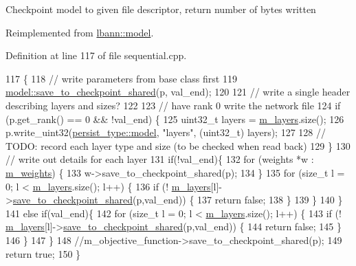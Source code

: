 Checkpoint model to given file descriptor, return number of bytes written 

Reimplemented from \hyperlink{classlbann_1_1model_a3d589d2e46ad35d0a1221e25bef70fa4}{lbann\+::model}.



Definition at line 117 of file sequential.\+cpp.


\begin{DoxyCode}
117                                                                          \{
118   \textcolor{comment}{// write parameters from base class first}
119   \hyperlink{classlbann_1_1model_a3d589d2e46ad35d0a1221e25bef70fa4}{model::save\_to\_checkpoint\_shared}(p, val\_end);
120 
121   \textcolor{comment}{// write a single header describing layers and sizes?}
122 
123   \textcolor{comment}{// have rank 0 write the network file}
124   \textcolor{keywordflow}{if} (p.get\_rank() == 0 && !val\_end) \{
125     uint32\_t layers = \hyperlink{classlbann_1_1model_a0229fc226ec163d1411548446104569d}{m\_layers}.size();
126     p.write\_uint32(\hyperlink{namespacelbann_adee41f31f15f3906cbdcce4a1417eb56a20f35e630daf44dbfa4c3f68f5399d8c}{persist\_type::model}, \textcolor{stringliteral}{"layers"}, (uint32\_t) layers);
127 
128     \textcolor{comment}{// TODO: record each layer type and size (to be checked when read back)}
129   \}
130   \textcolor{comment}{// write out details for each layer}
131   \textcolor{keywordflow}{if}(!val\_end)\{
132     \textcolor{keywordflow}{for} (weights *w : \hyperlink{classlbann_1_1model_aaf9adefe4497d90bf5bc2567e71bfb00}{m\_weights}) \{
133       w->save\_to\_checkpoint\_shared(p);
134     \}
135       \textcolor{keywordflow}{for} (\textcolor{keywordtype}{size\_t} l = 0; l < \hyperlink{classlbann_1_1model_a0229fc226ec163d1411548446104569d}{m\_layers}.size(); l++) \{
136       \textcolor{keywordflow}{if} (! \hyperlink{classlbann_1_1model_a0229fc226ec163d1411548446104569d}{m\_layers}[l]->\hyperlink{classlbann_1_1sequential__model_a226032d9890b8770c6fca54bf70d69eb}{save\_to\_checkpoint\_shared}(p,val\_end)) \{
137         \textcolor{keywordflow}{return} \textcolor{keyword}{false};
138       \}
139   \}
140   \}
141   \textcolor{keywordflow}{else} \textcolor{keywordflow}{if}(val\_end)\{
142     \textcolor{keywordflow}{for} (\textcolor{keywordtype}{size\_t} l = 0; l < \hyperlink{classlbann_1_1model_a0229fc226ec163d1411548446104569d}{m\_layers}.size(); l++) \{
143       \textcolor{keywordflow}{if} (! \hyperlink{classlbann_1_1model_a0229fc226ec163d1411548446104569d}{m\_layers}[l]->\hyperlink{classlbann_1_1sequential__model_a226032d9890b8770c6fca54bf70d69eb}{save\_to\_checkpoint\_shared}(p,val\_end)) \{
144         \textcolor{keywordflow}{return} \textcolor{keyword}{false};
145       \}
146     \}
147   \}
148   \textcolor{comment}{//m\_objective\_function->save\_to\_checkpoint\_shared(p);}
149   \textcolor{keywordflow}{return} \textcolor{keyword}{true};
150 \}
\end{DoxyCode}
